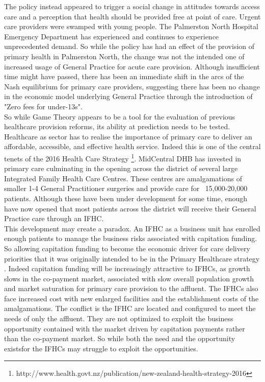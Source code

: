 \documentclass[11pt,a4paper]{article}
\begin{document}
The policy instead appeared to trigger a social change in attitudes towards access care and a perception that health should be provided free at point of care. Urgent care providers were swamped with young people. The Palmerston North Hospital Emergency Department has experienced and continues to experience unprecedented demand. So while the policy has had an effect of the provision of primary health in Palmerston North, the change was not the intended one of increased usage of General Practice for acute care provision. Although insufficient time might have passed, there has been an immediate shift in the arcs of the Nash equilibrium for primary care providers, suggesting there has been no change in the economic model underlying General Practice through the introduction of "Zero fees for under-13s".\\


So while Game Theory appears to be a tool for the evaluation of previous healthcare provision reforms, its ability at prediction needs to be tested. Healthcare as sector has to realise the importance of primary care to deliver an affordable, accessible, and effective health service. Indeed this is one of the central tenets of the 2016 Health Care Strategy \footnote{http://www.health.govt.nz/publication/new-zealand-health-strategy-2016}. MidCentral DHB has invested in primary care culminating in the opening across the district of several large Integrated Family Health Care Centres. These centres are amalgamations of smaller 1-4 General Practitioner surgeries and provide care for ~15,000-20,000 patients. Although these have been under development for some time, enough have now opened that most patients across the district will receive their General Practice care through an IFHC.\\


This development may create a paradox. An IFHC as a business unit has enrolled enough patients to manage the business risks associated with capitation funding. So allowing capitation funding to become the economic driver for care delivery priorities that it was originally intended to be in the Primary Healthcare strategy \citep{king2001primary}. Indeed capitation funding will be increasingly attractive to IFHCs, as growth slows in the co-payment market, associated with slow overall population growth and market saturation for primary care provision to the affluent. The IFHCs also face increased cost with new enlarged facilities and the establishment costs of the amalgamations. The conflict is the IFHC are located and configured to meet the needs of only the affluent. They are not optimized to exploit the business opportunity contained with the market driven by capitation payments rather than the co-payment market. So while both the need and the opportunity existsfor the IFHCs may struggle to exploit the opportunities.\\
\end{document}
